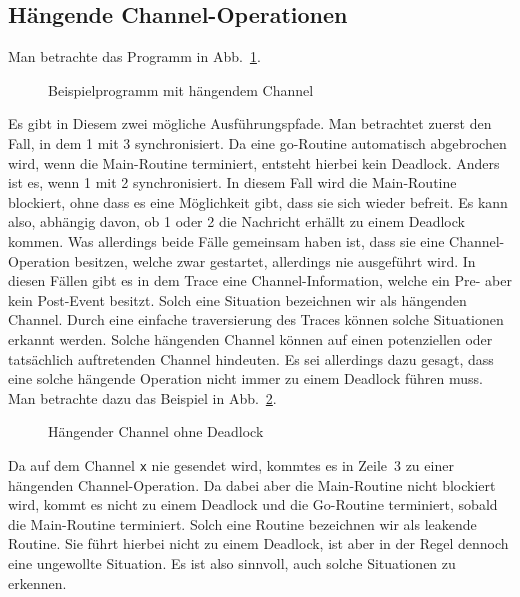 \subsection{Hängende Channel-Operationen}
Man betrachte das Programm in Abb.~\ref{Chap:Analyze-Sec:Channel-SubSec:Dangling-Fig:ExDangling}.
\begin{figure}[h!]
  
  \caption{Beispielprogramm mit hängendem Channel}
  \label{Chap:Analyze-Sec:Channel-SubSec:Dangling-Fig:ExDangling}
\end{figure}
Es gibt in Diesem zwei mögliche Ausführungspfade. Man betrachtet zuerst den Fall, in dem 1 mit 3 synchronisiert. 
Da eine go-Routine automatisch abgebrochen wird,  
wenn die Main-Routine terminiert, entsteht hierbei kein Deadlock. Anders ist es, wenn 1 mit 2 synchronisiert. 
In diesem Fall wird die Main-Routine blockiert, ohne dass es eine Möglichkeit gibt, dass sie sich wieder 
befreit. Es kann also, abhängig davon, ob 1 oder 2 die Nachricht erhällt zu einem Deadlock kommen. Was 
allerdings beide Fälle gemeinsam haben ist, dass sie eine Channel-Operation besitzen, welche zwar 
gestartet, allerdings nie ausgeführt wird.
In diesen Fällen gibt es in dem Trace eine Channel-Information, 
welche ein Pre- aber kein Post-Event besitzt. Solch eine Situation bezeichnen wir als hängenden Channel. 
Durch eine einfache traversierung des Traces können solche Situationen erkannt werden. Solche hängenden 
Channel können auf einen potenziellen oder tatsächlich auftretenden Channel hindeuten.
Es sei allerdings dazu gesagt, dass eine solche hängende Operation nicht immer zu einem Deadlock führen muss.
Man betrachte dazu das Beispiel in Abb.~\ref{Chap:Analyze-Sec:Channel-SubSec:Dangling-Fig:ExDanglingWithout}.
\begin{figure}[h!]
  
  \caption{Hängender Channel ohne Deadlock}
  \label{Chap:Analyze-Sec:Channel-SubSec:Dangling-Fig:ExDanglingWithout}
\end{figure}
Da auf dem Channel \texttt{x} nie gesendet wird, kommtes es in Zeile~3 zu einer hängenden Channel-Operation. Da 
dabei aber die Main-Routine nicht blockiert wird, kommt es nicht zu einem Deadlock und die Go-Routine 
terminiert, sobald die Main-Routine terminiert. Solch eine Routine bezeichnen wir als leakende Routine.
Sie führt hierbei nicht zu einem Deadlock, ist aber in der Regel dennoch eine ungewollte Situation.
Es ist also sinnvoll, auch solche Situationen zu erkennen.\\\\
